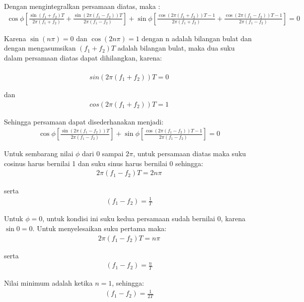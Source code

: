 \documentclass{article}
\begin{document}
Dengan mengintegralkan persamaan diatas, maka :
\begin{align}
    \cos \phi \left[ \frac{\sin (f_1 + f_2)T}{2\pi (f_1 + f_2)} + \frac{\sin (2\pi (f_1 - f_2))T}{2\pi (f_1 - f_2)} \right] + \sin \phi \left[ \frac{\cos (2\pi (f_1 + f_2))T - 1}{2\pi (f_1 + f_2)} + \frac{\cos (2\pi (f_1 - f_2))T - 1}{2\pi (f_1 - f_2)} \right] = 0
    \nonumber
\end{align}

Karena $\sin(n\pi )=0$ dan $\cos (2n\pi)=1$ dengan n adalah bilangan bulat dan dengan mengasumsikan $(f_{1}+f_{2})T$ adalah bilangan bulat, maka dua suku dalam persamaan diatas dapat dihilangkan, karena:\\\\
\begin{align}
    sin(2\pi(f_{1}+f_{2}))T=0
    \nonumber
\end{align}

dan
\begin{align}
    cos(2\pi(f_{1}+f_{2}))T=1
    \nonumber
\end{align}

Sehingga persamaan dapat disederhanakan menjadi:
\begin{align}
    \cos \phi \left[ \frac{\sin (2\pi (f_1 - f_2))T}{2\pi (f_1 - f_2)} \right] + \sin \phi \left[ \frac{\cos (2\pi (f_1 - f_2))T - 1}{2\pi (f_1 - f_2)} \right] = 0
    \nonumber
\end{align}

Untuk sembarang nilai $\phi$ dari 0 sampai $2\pi$, untuk persamaan diatas maka suku cosinus harus bernilai 1 dan suku sinus harus bernilai 0 sehingga:
\begin{align}
    2\pi(f_{1}-f_{2})T=2n\pi
    \nonumber
\end{align}

serta
\begin{align}
    (f_{1}-f_{2})=\frac{1}{T}
    \nonumber
\end{align}

Untuk $\phi = 0$, untuk kondisi ini suku kedua persamaan sudah bernilai 0, karena $\sin 0 = 0$. Untuk menyelesaikan suku pertama maka:
\begin{align}
    2\pi(f_{1}-f_{2})T=n\pi
    \nonumber
\end{align}

serta
\begin{align}
    (f_{1}-f_{2})=\frac{n}{T}
    \nonumber
\end{align}

Nilai minimum adalah ketika $n=1$, sehingga:
\begin{align}
    (f_{1}-f_{2})=\frac{1}{2T}
    \nonumber
\end{align}
\end{document}
